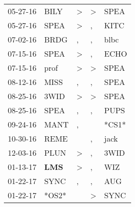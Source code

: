 \begin{supertabular}{p{0.07\textwidth}p{0.06\textwidth}p{0.02\textwidth}p{0.02\textwidth}p{0.06\textwidth}}
          05-27-16\textsuperscript{} &           BILY\textsuperscript{} &     \textgreater &     \textgreater &           SPEA\textsuperscript{} \\
          05-27-16\textsuperscript{} &           SPEA\textsuperscript{} &     \textgreater &                , &           KITC\textsuperscript{} \\
          07-02-16\textsuperscript{} &           BRDG\textsuperscript{} &                , &                , &           blbc\textsuperscript{} \\
          07-15-16\textsuperscript{} &           SPEA\textsuperscript{} &     \textgreater &                , &           ECHO\textsuperscript{} \\
          07-15-16\textsuperscript{} &           prof\textsuperscript{} &     \textgreater &     \textgreater &           SPEA\textsuperscript{} \\
          08-12-16\textsuperscript{} &           MISS\textsuperscript{} &                , &                , &           SPEA\textsuperscript{} \\
          08-25-16\textsuperscript{} &           3WID\textsuperscript{} &     \textgreater &     \textgreater &           SPEA\textsuperscript{} \\
          08-25-16\textsuperscript{} &           SPEA\textsuperscript{} &                , &                , &           PUPS\textsuperscript{} \\
          09-24-16\textsuperscript{} &           MANT\textsuperscript{} &                , &                  &                            *CS1* \\
          10-30-16\textsuperscript{} &           REME\textsuperscript{} &                  &                , &           jack\textsuperscript{} \\
          12-03-16\textsuperscript{} &           PLUN\textsuperscript{} &     \textgreater &                , &           3WID\textsuperscript{} \\
          01-13-17\textsuperscript{} &   \textbf{LMS\textsuperscript{}} &     \textgreater &                , &            WIZ\textsuperscript{} \\
          01-22-17\textsuperscript{} &           SYNC\textsuperscript{} &                , &                , &            AUG\textsuperscript{} \\
          01-22-17\textsuperscript{} &                            *OS2* &                  &     \textgreater &           SYNC\textsuperscript{} \\

\end{supertabular}
